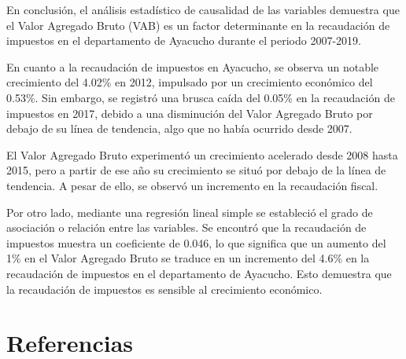 \documentclass[
  letterpaper,
  DIV=11,
  numbers=noendperiod]{scrartcl}
\begin{document}
En conclusión, el análisis estadístico de causalidad de las variables
demuestra que el Valor Agregado Bruto (VAB) es un factor determinante en
la recaudación de impuestos en el departamento de Ayacucho durante el
periodo 2007-2019.

En cuanto a la recaudación de impuestos en Ayacucho, se observa un
notable crecimiento del 4.02\% en 2012, impulsado por un crecimiento
económico del 0.53\%. Sin embargo, se registró una brusca caída del
0.05\% en la recaudación de impuestos en 2017, debido a una disminución
del Valor Agregado Bruto por debajo de su línea de tendencia, algo que
no había ocurrido desde 2007.

El Valor Agregado Bruto experimentó un crecimiento acelerado desde 2008
hasta 2015, pero a partir de ese año su crecimiento se situó por debajo
de la línea de tendencia. A pesar de ello, se observó un incremento en
la recaudación fiscal.

Por otro lado, mediante una regresión lineal simple se estableció el
grado de asociación o relación entre las variables. Se encontró que la
recaudación de impuestos muestra un coeficiente de 0.046, lo que
significa que un aumento del 1\% en el Valor Agregado Bruto se traduce
en un incremento del 4.6\% en la recaudación de impuestos en el
departamento de Ayacucho. Esto demuestra que la recaudación de impuestos
es sensible al crecimiento económico.

\hypertarget{referencias}{%
\section{Referencias}\label{referencias}}

\printbibliography[heading=none]
\end{document}
